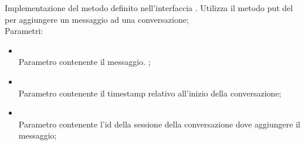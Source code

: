 \begin{itemize}
\begin{itemize}
		Implementazione del metodo definito nell'interfaccia . Utilizza il metodo put del  per aggiungere un messaggio ad una conversazione;\\
		Parametri:
		\begin{itemize}
			\item {} \\
			Parametro contenente il messaggio.
;
			\item {} \\
			Parametro contenente il timestamp relativo all'inizio della conversazione;
			\item {} \\
			Parametro contenente l'id della sessione della conversazione dove aggiungere il messaggio;
		\end{itemize}
	\end{itemize}
\end{itemize}

